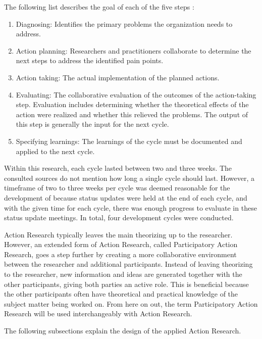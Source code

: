 The following list describes the goal of each of the five steps \cite{baskerville1999investigating}:
\begin{enumerate}
	\item Diagnosing: Identifies the primary problems the organization needs to address.
	\item Action planning: Researchers and practitioners collaborate to determine the next steps to address the identified pain points.
	\item Action taking: The actual implementation of the planned actions.
	\item Evaluating: The collaborative evaluation of the outcomes of the action-taking step. Evaluation includes determining whether the theoretical effects of the action were realized and whether this relieved the problems. The output of this step is generally the input for the next cycle.
	\item Specifying learnings: The learnings of the cycle must be documented and applied to the next cycle.
\end{enumerate}

Within this research, each cycle lasted between two and three weeks. The consulted sources do not mention how long a single cycle should last. However, a timeframe of two to three weeks per cycle was deemed reasonable for the development of \prototype{} because status updates were held at the end of each cycle, and with the given time for each cycle, there was enough progress to evaluate in these status update meetings. In total, four development cycles were conducted.

Action Research typically leaves the main theorizing up to the researcher. However, an extended form of Action Research, called Participatory Action Research, goes a step further by creating a more collaborative environment between the researcher and additional participants. Instead of leaving theorizing to the researcher, new information and ideas are generated together with the other participants, giving both parties an active role. This is beneficial because the other participants often have theoretical and practical knowledge of the subject matter being worked on. \cite{baskerville1999investigating} From here on out, the term Participatory Action Research will be used interchangeably with Action Research.

The following subsections explain the design of the applied Action Research.

